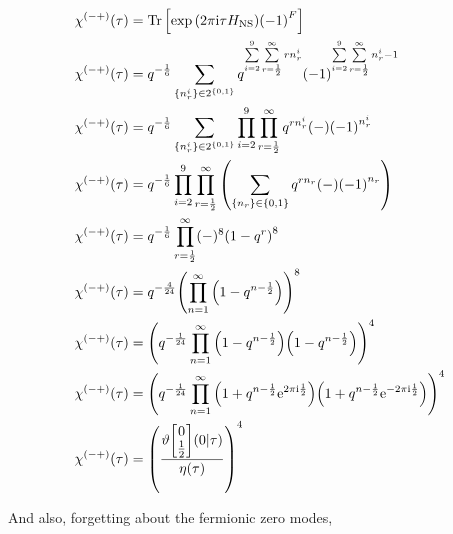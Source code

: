 \begin{align*}
    \chi^{(-+)}\qty(\tau)&=\Tr\qty[\exp\qty(2\pi\im\tau H_{\textnormal{NS}})\qty(-1)^F]\\
    \chi^{(-+)}\qty(\tau)&=q^{-\frac16}\sum\limits_{\qty{n_r^i}\in 2^{\qty{0,1}}}q^{\sum\limits_{i=2}^9\sum\limits_{r=\frac12}^\infty rn_r^i}(-1)^{\sum\limits_{i=2}^9\sum\limits_{r=\frac12}^\infty n_r^i-1}\\
    \chi^{(-+)}\qty(\tau)&=q^{-\frac16}\sum\limits_{\qty{n_r^i}\in 2^{\qty{0,1}}}\prod\limits_{i=2}^9\prod\limits_{r=\frac12}^\infty q^{ rn_r^i}(-)\qty(-1)^{n_r^i} \\
    \chi^{(-+)}\qty(\tau)&=q^{-\frac16}\prod\limits_{i=2}^9\prod\limits_{r=\frac12}^\infty\qty(\sum\limits_{\qty{n_r}\in\qty{0,1}} q^{ rn_r}(-)\qty(-1)^{n_r} )\\
    \chi^{(-+)}\qty(\tau)&=q^{-\frac16}\prod\limits_{r=\frac12}^\infty(-)^8\qty(1-q^r )^8\\
    \chi^{(-+)}\qty(\tau)&=q^{-\frac{4}{24}}\qty(\prod\limits_{n=1}^\infty\qty(1-q^{n-\frac12} ))^8\\
    \chi^{(-+)}\qty(\tau)&=\qty(q^{-\frac{1}{24}}\prod\limits_{n=1}^\infty\qty(1-q^{n-\frac12} )\qty(1-q^{n-\frac12} ))^4\\
    \chi^{(-+)}\qty(\tau)&=\qty(q^{-\frac{1}{24}}\prod\limits_{n=1}^\infty\qty(1+q^{n-\frac12}\e^{2\pi\im\frac12} )\qty(1+q^{n-\frac12}\e^{-2\pi\im\frac12} ))^4\\
    \chi^{(-+)}\qty(\tau)&=\qty(\frac{\vartheta\mqty[0\\\frac12]\qty(0|\tau)}{\eta\qty(\tau)})^4
\end{align*}

And also, forgetting about the fermionic zero modes,

